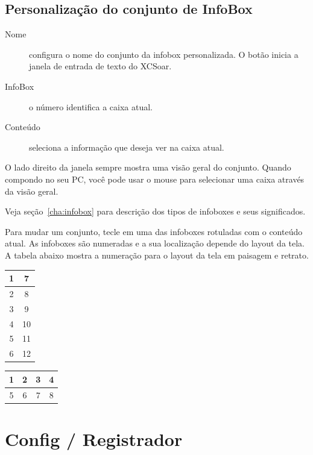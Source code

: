 \subsection*{Personalização do conjunto de InfoBox}

\begin{description}
\item[Nome]  configura o nome do conjunto da infobox personalizada.  O botão inicia a janela de entrada de texto do XCSoar.
\item[InfoBox]  o número identifica a caixa atual.
\item[Conteúdo] seleciona a informação que deseja ver na caixa atual.
\end{description}

O lado direito da janela sempre mostra uma visão geral do conjunto.  Quando compondo no seu PC, você pode usar o mouse para selecionar uma caixa através da visão geral.

Veja seção~\ref{cha:infobox} para descrição dos tipos de infoboxes e seus significados.

Para mudar um conjunto, tecle em uma das infoboxes rotuladas com o conteúdo atual.  As infoboxes são numeradas e a sua localização depende do layout da tela.  A tabela abaixo mostra a numeração para o layout da tela em paisagem e retrato. 



\begin{multicols}{2}
\begin{tabular}{|c|c|}
\hline
1 & 7 \\
\hline
2 & 8 \\
\hline
3 & 9 \\
\hline
4 & 10 \\
\hline
5 & 11 \\
\hline
6 & 12 \\
\hline
\end{tabular}

\begin{tabular}{|c|c|c|c|}
\hline
1 & 2 & 3 & 4 \\
\hline
\hline
5 & 6 & 7 & 8 \\
\hline
\end{tabular}
\end{multicols}


\section{Config / Registrador} \label{conf:logger}


